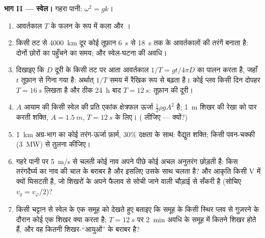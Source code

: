 \begin{problem}[{सप्ताहांत समस्या --- परिक्षेपण काम पर: वह तार-केबल
जिसने बिंदुओं को लीप दिया, वह स्वेल जो तूफ़ान की सूचना देती है, वह
सुनामी जो पूरा महासागर पार कर जाती है, और वह पुंज जो फैलता है}]
\medskip
\noindent\textbf{भाग II --- स्वेल।}
गहरा पानी: $\omega^2 = gk$।
\begin{enumerate}[resume]
  \item आवर्तकाल $T$ के फलन के रूप में कला और ।
  \item किसी तट से \qty{4000}{km} दूर कोई तूफ़ान \qty{6}{s} से \qty{18}{s} तक के
        आवर्तकालों की तरंगें बनाता है: दोनों छोरों का पहुँचने का समय;
        और स्वेल-घटना की अवधि।
  \item दिखाइए कि $D$ दूरी के किसी तट पर आता आवर्तकाल
        $1/T = gt/4\pi D$ का पालन करता है, जहाँ $t$ तूफ़ान से गिना गया है: अर्थात् $1/T$
        समय में रैखिक रूप से बढ़ता है। कोई प्लव किसी दिन दोपहर $T = \qty{16}{s}$
        लिखता है और ठीक \qty{24}{h} बाद $T = \qty{12}{s}$: तूफ़ान की
        दूरी।
  \item $A$ आयाम की किसी स्वेल की प्रति एकांक क्षेत्रफल ऊर्जा $\tfrac12\rho
        gA^2$ है; \qty{1}{m} शिखर की रेखा को पार करती शक्ति, $A =
        \qty{1.5}{m}$, $T = \qty{12}{s}$ के लिए। ( लीजिए --- क्यों?)
  \item \qty{1}{km} अग्र-भाग का कोई तरंग-ऊर्जा फ़ार्म, $30\%$ दक्षता के साथ:
        वैद्युत शक्ति; किसी पवन-चक्की (\qty{3}{MW}) से तुलना कीजिए।
  \item गहरे पानी पर \qty{5}{m/s} से चलती कोई नाव अपने पीछे कोई अचल
        अनुतरंग छोड़ती है: किस तरंगदैर्घ्य का 
        नाव की चाल के बराबर है और इसलिए उसके साथ चलता है? और आकृति किसी V में
        क्यों घिसटती है, जो शिखरों के अपने फैलाव से सोची जाने वाली चौड़ाई से
        सँकरी है (सोचिए $v_g = v_\varphi/2$)?
  \item किसी चट्टान से स्वेल के एक समूह को देखते हुए बताइए कि समूह के
        किसी स्थिर प्लव से गुज़रने के दौरान कोई एक शिखर क्या करता है;
        $T = \qty{12}{s}$ पर \qty{2}{min} अवधि के समूह में कितने
        शिखर होते हैं, और वह कितनी शिखर-``आयुओं'' के
        बराबर है?
\end{enumerate}


\end{problem}
